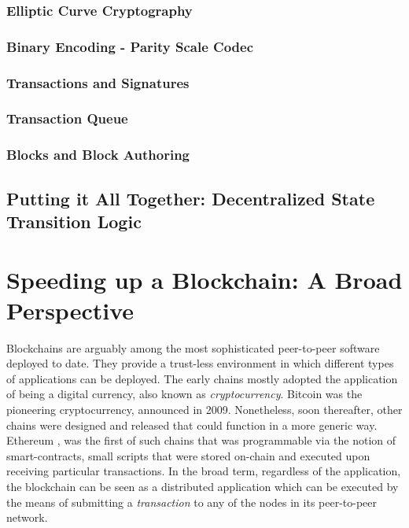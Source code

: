 \subsubsection{Elliptic Curve Cryptography}
\subsubsection{Binary Encoding - Parity Scale Codec}
\subsubsection{Transactions and Signatures}
\subsubsection{Transaction Queue}

\subsubsection{Blocks and Block Authoring}

\subsection{Putting it All Together: Decentralized State Transition Logic}

\section{Speeding up a Blockchain: A Broad Perspective} \label{chap_bg:sec:ways_to_speedup}

Blockchains are arguably among the most sophisticated peer-to-peer software deployed to date. They provide a trust-less environment in which different types of applications can be deployed. The early chains mostly adopted the application of being a digital currency, also known as \textit{cryptocurrency}. Bitcoin \cite{Nakamoto} was the pioneering cryptocurrency, announced in 2009. Nonetheless, soon thereafter, other chains were designed and released that could function in a more generic way. Ethereum \cite{etherwhite}, was the first of such chains that was programmable via the notion of smart-contracts, small scripts that were stored on-chain and executed upon receiving particular transactions. In the broad term, regardless of the application, the blockchain can be seen as a distributed application which can be executed by the means of submitting a \textit{transaction} to any of the nodes in its peer-to-peer network.


